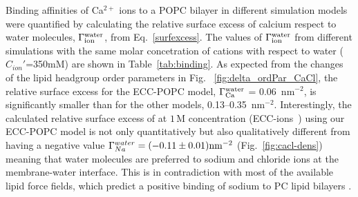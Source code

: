 \documentclass[aip,jcp,twocolumn]{revtex4}
\begin{document}
Binding affinities of Ca$^{2+}$ ions to a POPC bilayer in different simulation models were quantified by calculating the relative surface excess of calcium respect to water molecules, $\Gamma_{\rm ion}^{\rm water}$, from Eq.~\ref{surfexcess}.
The values of $\Gamma_{\rm ion}^{\rm water}$
from different simulations with the same molar concetration of cations with respect
to water ($C_{ion}'$=350mM) are shown in Table~\ref{tab:binding}.
As expected from the changes of the lipid headgroup order parameters in Fig.~ \ref{fig:delta_ordPar_CaCl}, the relative surface excess for the ECC-POPC model, $\Gamma_{\rm Ca}^{\rm water}$ = 0.06~nm$^{-2}$, is significantly smaller than for the other models, 0.13--0.35~nm$^{-2}$.
Interestingly, the calculated relative surface excess of  at $1\,\mathrm{M}$ concentration (ECC-ions~\cite{Pluharova2014}) using our ECC-POPC model is not only quantitatively but also qualitatively different from  having a negative value $\Gamma_{Na}^{water} = (-0.11 \pm 0.01) \rm{nm}^{-2}$ (Fig.~\ref{fig:cacl-dens}) 
meaning that water molecules are preferred to sodium and chloride ions at the membrane-water interface.  
This is in contradiction with most of the available lipid force fields, which predict a positive binding of sodium to PC lipid bilayers \cite{catte16}.
\end{document}
